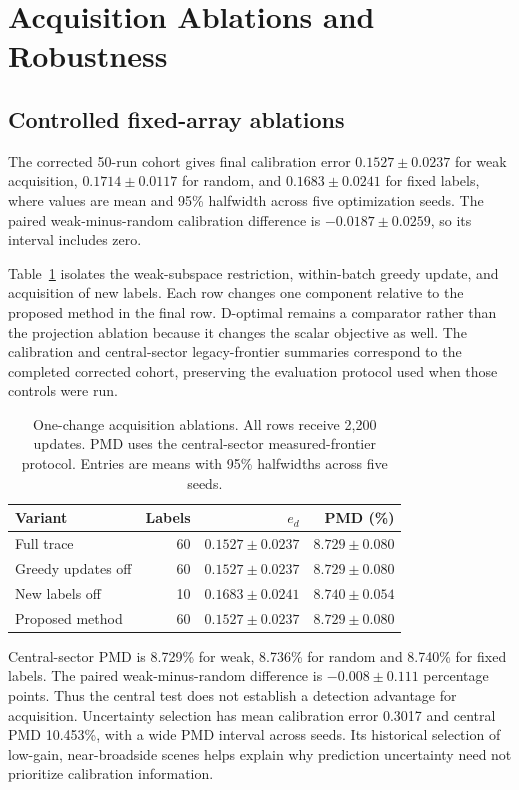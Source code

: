 \documentclass[conference]{IEEEtran}
\begin{document}
\section{Acquisition Ablations and Robustness}\label{sec:ablations}
\subsection{Controlled fixed-array ablations}
The corrected 50-run cohort gives final calibration error $0.1527\pm0.0237$ for weak acquisition, $0.1714\pm0.0117$ for random, and $0.1683\pm0.0241$ for fixed labels, where values are mean and 95\% halfwidth across five optimization seeds. The paired weak-minus-random calibration difference is $-0.0187\pm0.0259$, so its interval includes zero.

Table~\ref{tab:ablation-final} isolates the weak-subspace restriction, within-batch greedy update, and acquisition of new labels. Each row changes one component relative to the proposed method in the final row. D-optimal remains a comparator rather than the projection ablation because it changes the scalar objective as well. The calibration and central-sector legacy-frontier summaries correspond to the completed corrected cohort, preserving the evaluation protocol used when those controls were run.
\begin{table}[t]\centering\small
\caption{One-change acquisition ablations. All rows receive 2,200 updates. PMD uses the central-sector measured-frontier protocol. Entries are means with 95\% halfwidths across five seeds.}\label{tab:ablation-final}
\setlength{\tabcolsep}{3pt}
\begin{tabular}{lrrr}\toprule
Variant & Labels & $e_d$ & PMD (\%)\\\midrule
Full trace & 60 & $0.1527\pm0.0237$ & $8.729\pm0.080$\\
Greedy updates off & 60 & $0.1527\pm0.0237$ & $8.729\pm0.080$\\
New labels off & 10 & $0.1683\pm0.0241$ & $8.740\pm0.054$\\
Proposed method & 60 & $0.1527\pm0.0237$ & $8.729\pm0.080$\\
\bottomrule\end{tabular}
\end{table}
Central-sector PMD is 8.729\% for weak, 8.736\% for random and 8.740\% for fixed labels. The paired weak-minus-random difference is $-0.008\pm0.111$ percentage points. Thus the central test does not establish a detection advantage for acquisition. Uncertainty selection has mean calibration error 0.3017 and central PMD 10.453\%, with a wide PMD interval across seeds. Its historical selection of low-gain, near-broadside scenes helps explain why prediction uncertainty need not prioritize calibration information.
\end{document}
